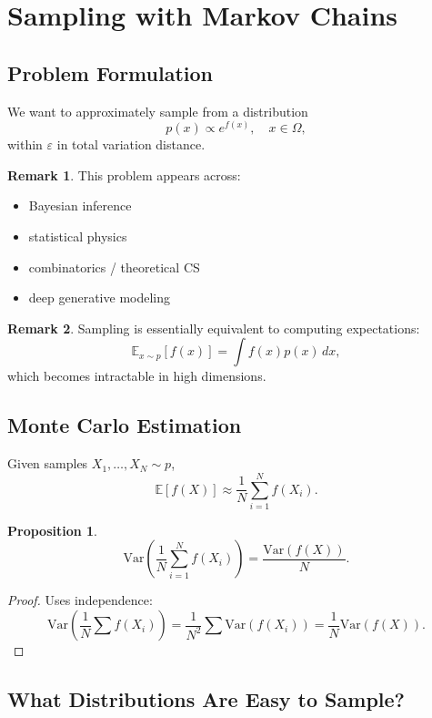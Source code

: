 \documentclass[12pt,oneside]{book}
\numberwithin{equation}{section}
\theoremstyle{definition}
\newtheorem{remark}{Remark}[section]
\theoremstyle{plain}
\newtheorem{proposition}{Proposition}[section]
\theoremstyle{remark}
\newcommand{\E}{\mathbb{E}}
\newcommand{\Var}{\mathrm{Var}}
\begin{document}
\section{Sampling with Markov Chains}

\subsection*{Problem Formulation}

We want to approximately sample from a distribution
\[
p(x) \propto e^{f(x)}, \quad x \in \Omega,
\]
within $\varepsilon$ in total variation distance.

\begin{remark}
This problem appears across:
\begin{itemize}
\item Bayesian inference
\item statistical physics
\item combinatorics / theoretical CS
\item deep generative modeling
\end{itemize}
\end{remark}

\begin{remark}
Sampling is essentially equivalent to computing expectations:
\[
\E_{x \sim p}[f(x)] = \int f(x)p(x)\,dx,
\]
which becomes intractable in high dimensions.
\end{remark}


\subsection{Monte Carlo Estimation}

Given samples $X_1,\dots,X_N \sim p$,
\[
\E[f(X)] \approx \frac{1}{N} \sum_{i=1}^N f(X_i).
\]

\begin{proposition}
\[
\Var\!\left(\frac{1}{N}\sum_{i=1}^N f(X_i)\right)
=
\frac{\Var(f(X))}{N}.
\]
\end{proposition}

\begin{proof}
Uses independence:
\[
\Var\!\left(\frac{1}{N}\sum f(X_i)\right)
=
\frac{1}{N^2}\sum \Var(f(X_i))
=
\frac{1}{N}\Var(f(X)).
\]
\end{proof}


\subsection*{What Distributions Are Easy to Sample?}
\end{document}
